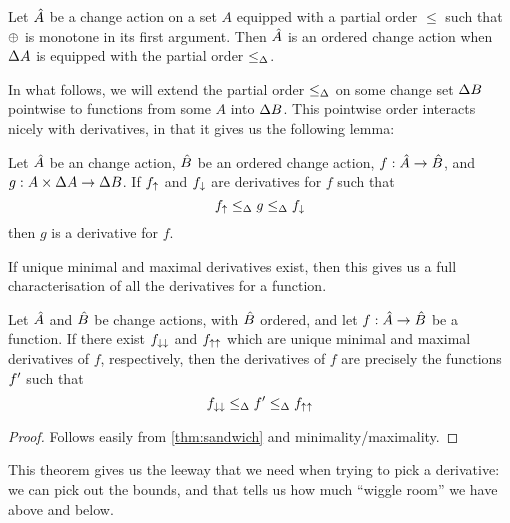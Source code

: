 \begin{prop}
  Let $\hat{A}$ be a change action on a set $A$ equipped with a partial order $\leq$ such that
  $\oplus$ is monotone in its first argument. Then $\hat{A}$ is an ordered change action when
  $\Delta A$ is equipped with the partial order $\leq_\Delta$.
\end{prop}

In what follows, we will extend the partial order $\leq_\Delta$ on some change
set $\Delta B$ pointwise to functions from some $A$ into $\Delta B$. This pointwise
order interacts nicely with derivatives, in that it gives us the following lemma:

\begin{thm}
  \label{thm:sandwich}
  Let $\hat{A}$ be an change action, $\hat{B}$ be an ordered change action,
  $f: \hat{A} \rightarrow \hat{B}$, and $g: A \times \Delta A \rightarrow
  \Delta B$. If $f_\uparrow$ and $f_\downarrow$ are
  derivatives for $f$ such that
  \begin{displaymath}
    f_\uparrow \leq_\Delta g \leq_\Delta f_\downarrow
  \end{displaymath}
  then $g$ is a derivative for $f$.
\end{thm}

If unique minimal and maximal derivatives exist, then this gives us a full
characterisation of all the derivatives for a function.

\begin{thm}
\label{thm:derivativeCharacterization}
  Let $\hat{A}$ and $\hat{B}$ be change actions, with $\hat{B}$ ordered, and let
  $f: \hat{A} \rightarrow \hat{B}$ be a function. If there exist $f_{\downarrow\downarrow}$ and
  $f_{\uparrow\uparrow}$ which are unique minimal and maximal derivatives of $f$,
  respectively, then the derivatives of $f$ are precisely
  the functions $f'$ such that
  \begin{displaymath}
    f_{\downarrow\downarrow} \leq_\Delta f' \leq_\Delta f_{\uparrow\uparrow}
  \end{displaymath}
\end{thm}
\ifproofs
\begin{proof}
  Follows easily from \cref{thm:sandwich} and minimality/maximality.
\end{proof}
\fi

This theorem gives us the leeway that we need when trying to pick a derivative: we can pick out the
bounds, and that tells us how much ``wiggle room'' we have above and below.

